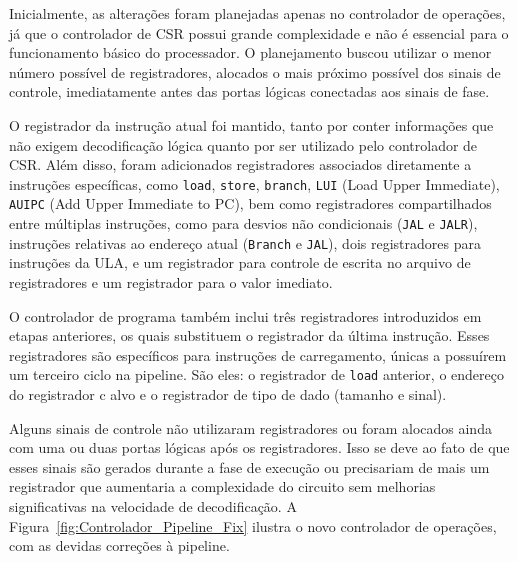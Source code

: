 \documentclass[
	12pt,				%
	openright,			%
	oneside,			%
	a4paper,			%
	english,			%
	french,				%
	spanish,			%
	brazil,				%
	]{abntex2}
\begin{document}
Inicialmente, as alterações foram planejadas apenas no controlador de operações, já que o controlador de CSR possui grande complexidade e não é essencial para o funcionamento básico do processador. O planejamento buscou utilizar o menor número possível de registradores, alocados o mais próximo possível dos sinais de controle, imediatamente antes das portas lógicas conectadas aos sinais de fase.

O registrador da instrução atual foi mantido, tanto por conter informações que não exigem decodificação lógica quanto por ser utilizado pelo controlador de CSR. Além disso, foram adicionados registradores associados diretamente a instruções específicas, como \texttt{load}, \texttt{store}, \texttt{branch}, \texttt{LUI} (Load Upper Immediate), \texttt{AUIPC} (Add Upper Immediate to PC), bem como registradores compartilhados entre múltiplas instruções, como para desvios não condicionais (\texttt{JAL} e \texttt{JALR}), instruções relativas ao endereço atual (\texttt{Branch} e \texttt{JAL}), dois registradores para instruções da ULA, e um registrador para controle de escrita no arquivo de registradores e um registrador para o valor imediato.

O controlador de programa também inclui três registradores introduzidos em etapas anteriores, os quais substituem o registrador da última instrução. Esses registradores são específicos para instruções de carregamento, únicas a possuírem um terceiro ciclo na pipeline. São eles: o registrador de \texttt{load} anterior, o endereço do registrador c alvo e o registrador de tipo de dado (tamanho e sinal).

Alguns sinais de controle não utilizaram registradores ou foram alocados ainda com uma ou duas portas lógicas após os registradores. Isso se deve ao fato de que esses sinais são gerados durante a fase de execução ou precisariam de mais um registrador que aumentaria a complexidade do circuito sem melhorias significativas na velocidade de decodificação. A Figura~\ref{fig:Controlador_Pipeline_Fix} ilustra o novo controlador de operações, com as devidas correções à pipeline.
\end{document}
